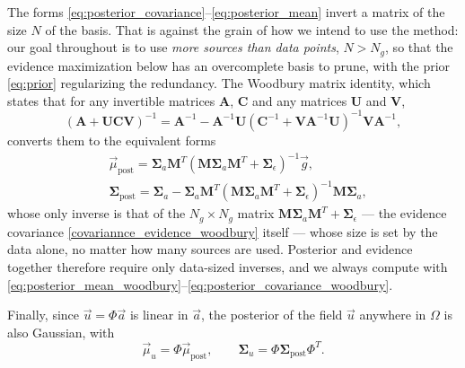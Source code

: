 \documentclass{article}
\begin{document}
The forms \eqref{eq:posterior_covariance}--\eqref{eq:posterior_mean} invert a matrix of the size $N$ of the basis. That is against the grain of how we intend to use the method: our goal throughout is to use \emph{more sources than data points}, $N > N_g$, so that the evidence maximization below has an overcomplete basis to prune, with the prior \eqref{eq:prior} regularizing the redundancy. The Woodbury matrix identity, which states that for any invertible matrices $\mathbf{A}$, $\mathbf{C}$ and any matrices $\mathbf{U}$ and $\mathbf{V}$,
\begin{equation}
    (\mathbf{A} + \mathbf{U}\mathbf{C}\mathbf{V})^{-1} = \mathbf{A}^{-1} - \mathbf{A}^{-1}\mathbf{U}(\mathbf{C}^{-1} + \mathbf{V}\mathbf{A}^{-1}\mathbf{U})^{-1} \mathbf{V}\mathbf{A}^{-1}, \label{eq:woodbury}
\end{equation}
converts them to the equivalent forms
\begin{align}
    &\vec{\mu}_{\text{post}}= \mathbf{\Sigma}_a \mathbf{M}^T\left( \mathbf{M}\mathbf{\Sigma}_a \mathbf{M}^T + \mathbf{\Sigma}_\epsilon\right)^{-1} \vec{g}, \label{eq:posterior_mean_woodbury}\\
    &\mathbf{\Sigma}_{\text{post}} = \mathbf{\Sigma}_a - \mathbf{\Sigma}_a \mathbf{M}^T (\mathbf{M} \mathbf{\Sigma}_a \mathbf{M}^T + \mathbf{\Sigma}_\epsilon)^{-1} \mathbf{M} \mathbf{\Sigma}_a, \label{eq:posterior_covariance_woodbury}
\end{align}
whose only inverse is that of the $N_g \times N_g$ matrix $\mathbf{M}\mathbf{\Sigma}_a\mathbf{M}^T + \mathbf{\Sigma}_\epsilon$ --- the evidence covariance \eqref{covariannce_evidence_woodbury} itself --- whose size is set by the data alone, no matter how many sources are used. Posterior and evidence together therefore require only data-sized inverses, and we always compute with \eqref{eq:posterior_mean_woodbury}--\eqref{eq:posterior_covariance_woodbury}.

Finally, since $\vec u = \Phi \vec a$ is linear in $\vec a$, the posterior of the field $\vec{u}$ anywhere in $\Omega$ is also Gaussian, with
\begin{equation}
    \vec{\mu}_u = \Phi \vec{\mu}_{\text{post}}, \qquad \mathbf{\Sigma}_u = \Phi \mathbf{\Sigma}_{\text{post}} \Phi^T. \label{eq:field_posterior}
\end{equation}
\end{document}
